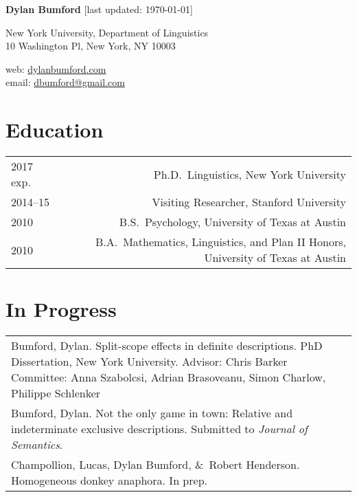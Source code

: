 \documentclass[12pt]{article}
\renewcommand{\arraystretch}{1.5} %
\newcommand{\with}{\&}
\begin{document}
\textbf{Dylan Bumford}\hfill
{\color{gray}[last updated: \today]}

\bigskip

\begin{minipage}[t]{0.55\textwidth}
New York University, Department of Linguistics\\
10 Washington Pl, New York, NY 10003
\end{minipage}
\begin{minipage}[t]{\linegoal}
\raggedleft%
web: \url{dylanbumford.com}\\
email: \href{mailto:dbumford@gmail.com}{dbumford@gmail.com}
\end{minipage}


\section*{Education}

\begingroup
\renewcommand{\arraystretch}{1} %
\begin{longtable}{LR}
  2017 exp.   & Ph.D.~Linguistics, New York University\\
  2014--15    & Visiting Researcher, Stanford University\\
  2010        & B.S.~Psychology, University of Texas at Austin\\
  2010        & B.A.~Mathematics, Linguistics, and Plan II Honors, University of
                Texas at Austin
\end{longtable}
\endgroup

\section*{In Progress}

\begin{longtable}{@{}p{\textwidth}@{}}
  Bumford, Dylan. Split-scope effects in definite descriptions. PhD
  Dissertation, New York University.\newline
  Advisor: Chris Barker\newline
  Committee: Anna Szabolcsi, Adrian Brasoveanu, Simon Charlow, Philippe
  Schlenker\\
  Bumford, Dylan. Not the only game in town: Relative and indeterminate exclusive
  descriptions. Submitted to \textit{Journal of Semantics}.\\
  Champollion, Lucas, Dylan Bumford, \with~Robert Henderson. Homogeneous 
  donkey anaphora. In prep.
\end{longtable}
\end{document}

